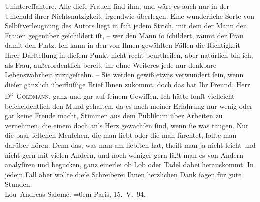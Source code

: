 \begin{ledgroupsized}[t]{13cm}
               Unintereſſantere. Alle dieſe Frauen ſind ihm, und wäre es auch nur in der Unſchuld
               ihrer Nichtsnutzigkeit, irgendwie überlegen. Eine wunderliche Sorte von
               Selbſtverleugnung \introOben{}des Autors\introOben{} liegt in faſt jedem Strich, mit
               dem der Mann den Frauen gegenüber geſchildert iſt, {\pb}– wer den Mann ſo ſchildert, räumt der
               Frau damit den Platz. Ich kann in den von Ihnen gewählten Fällen die Richtigkeit
               Ihrer Darſtellung in dieſem Punkt nicht recht beurtheilen, aber natürlich bin ich,
               als Frau, außerordentlich bereit, ihr ohne Weiteres jede nur denkbare Lebenswahrheit
               zuzugeſtehn. –\pend
           \pstart
           Sie werden gewiß etwas verwundert ſein, wenn dieſer gänzlich überflüſſige Brief Ihnen
               zukommt, doch das hat Ihr Freund, Herr \textsc{D\textsuperscript{r} }\textsc{Goldmann}, ganz und gar auf ſeinem Gewiſſen. Ich hätte ſonſt vielleicht beſcheidentlich
               den Mund gehalten, da es nach meiner Erfahrung nur wenig oder gar keine Freude macht,
               Stimmen aus dem Publikum über Arbeiten zu vernehmen, die einem doch an's Herz
               gewachſen ſind, wenn ſie was taugen. Nur die paar ſeltenen Menſchen, die man liebt
               oder die man fürchtet, ſollte man darüber hören. Denn das, was man am liebſten hat,
               theilt man ja {\pb}nicht leicht und nicht gern
               mit vielen Andern, und noch weniger gern läßt man es von Andern analyſiren und
               begucken, ganz einerlei ob Lob oder Tadel dabei herauskommt.\pend
           \pstart
           In jedem Fall aber wollte dieſe Schreiberei Ihnen herzlichen Dank ſagen für gute Stunden.{\\[\baselineskip]}\spacefill\mbox{Lou Andreas-Salomé.}\pend
           \leftskip=0em{}\pstart
           Paris, 15. V. 94. \pend
           
         
         \endnumbering{}\end{ledgroupsized}  \newcommand{\dateiname}{L00325}\newcommand{\titel}{Lou Andreas-Salomé an Arthur Schnitzler, 15. 5. 1894}\newcommand{\editorInnen}{Martin Anton Müller und Gerd-Hermann Susen}
      